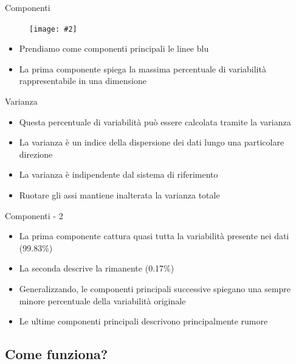 \documentclass[xcolor={dvipsnames}]{beamer}%
\newcommand{\figcen}[2]{
	\begin{figure}
		\begin{center}
			\texttt{[image: \#2]}
		\end{center}
	\end{figure}
}
\begin{document}
		\begin{frame}{Componenti}
			\figcen{.7\textwidth}{componenti}
			\begin{itemize}
				\item Prendiamo come componenti principali le linee blu
				\item La prima componente spiega la massima percentuale di variabilità rappresentabile in una dimensione
			\end{itemize}
		\end{frame}
	
		\begin{frame}{Varianza}
			\begin{itemize}
				\item Questa percentuale di variabilità può essere calcolata tramite la varianza
				\item La varianza è un indice della dispersione dei dati lungo una particolare direzione
				\item La varianza è indipendente dal sistema di riferimento
				\item Ruotare gli assi mantiene inalterata la varianza totale
			\end{itemize}
		\end{frame}
	
		\begin{frame}{Componenti - 2}
			\begin{itemize}
				\item La prima componente cattura quasi tutta la variabilità presente nei dati (99.83\%)
				\item La seconda descrive la rimanente (0.17\%)
				\item Generalizzando, le componenti principali successive spiegano una sempre minore percentuale della variabilità originale
				\item Le ultime componenti principali descrivono principalmente rumore
			\end{itemize}
		\end{frame}
		
	\subsection{Come funziona?}
	
\end{document}
